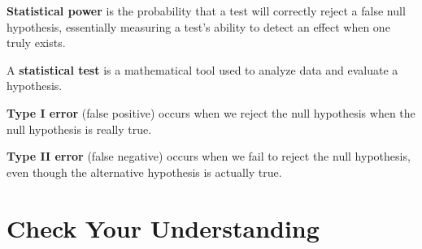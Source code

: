 \documentclass[
  letterpaper,
  DIV=11,
  numbers=noendperiod]{scrreprt}
\begin{document}
\textbf{Statistical power} is the probability that a test will correctly
reject a false null hypothesis, essentially measuring a test's ability
to detect an effect when one truly exists.

A \textbf{statistical test} is a mathematical tool used to analyze data
and evaluate a hypothesis.

\textbf{Type I error} (false positive) occurs when we reject the null
hypothesis when the null hypothesis is really true.

\textbf{Type II error} (false negative) occurs when we fail to reject
the null hypothesis, even though the alternative hypothesis is actually
true.

\section*{Check Your Understanding}\label{check-your-understanding-6}

\end{document}
